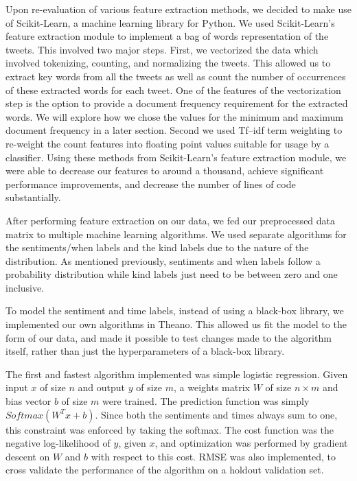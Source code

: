 \documentclass{article}
\begin{document}
Upon re-evaluation of various feature extraction methods, we decided to make use of Scikit-Learn, a machine learning library for Python. We used Scikit-Learn's feature extraction module to implement a bag of words representation of the tweets. This involved two major steps. First, we vectorized the data which involved tokenizing, counting, and normalizing the tweets. This allowed us to extract key words from all the tweets as well as count the number of occurrences of these extracted words for each tweet. One of the features of the vectorization step is the option to provide a document frequency requirement for the extracted words. We will explore how we chose the values for the minimum and maximum document frequency in a later section. Second we used Tf–idf term weighting to re-weight the count features into floating point values suitable for usage by a classifier. Using these methods from Scikit-Learn's feature extraction module, we were able to decrease our features to around a thousand, achieve significant performance improvements, and decrease the number of lines of code substantially.


After performing feature extraction on our data, we fed our preprocessed data matrix to multiple machine learning algorithms. We used separate algorithms for the sentiments/when labels and the kind labels due to the nature of the distribution. As mentioned previously, sentiments and when labels follow a probability distribution while kind labels just need to be between zero and one inclusive.

To model the sentiment and time labels, instead of using a black-box library, we implemented our own algorithms in Theano. This allowed us fit the model to the form of our data, and made it possible to test changes made to the algorithm itself, rather than just the hyperparameters of a black-box library.

The first and fastest algorithm implemented was simple logistic regression. Given input $x$ of size $n$ and output $y$ of size $m$, a weights matrix $W$ of size $n \times m$ and bias vector $b$ of size $m$ were trained. The prediction function was simply $Softmax(W^Tx+b)$. Since both the sentiments and times always sum to one, this constraint was enforced by taking the softmax. The cost function was the negative log-likelihood of $y$, given $x$, and optimization was performed by gradient descent on $W$ and $b$ with respect to this cost. RMSE was also implemented, to cross validate the performance of the algorithm on a holdout validation set.
\end{document}
